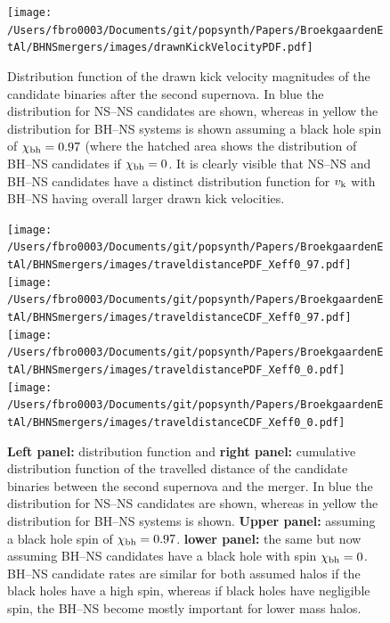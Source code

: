 \documentclass[a4paper,fleqn,usenatbib,useAMS,usedcolumn]{mnras}
\begin{document}
\begin{figure}
	\texttt{[image: /Users/fbro0003/Documents/git/popsynth/Papers/BroekgaardenEtAl/BHNSmergers/images/drawnKickVelocityPDF.pdf]} %
    \caption{Distribution function of the drawn kick velocity magnitudes of the candidate binaries after the second supernova. In blue the distribution for NS--NS candidates are shown, whereas in yellow the distribution for BH--NS systems is shown assuming a black hole spin of  $\chi_{\rm{bh}} = 0.97$ (where the hatched  area shows the distribution of BH--NS candidates if $\chi_{\rm{bh}} = 0$. It is clearly visible that NS--NS and BH--NS candidates have a distinct distribution function for $v_{\rm{k }}$ with BH--NS having overall larger drawn kick velocities.}
    \label{fig:NbinariesVsNHits}
\end{figure}
%

%
\begin{figure}
		\texttt{[image: /Users/fbro0003/Documents/git/popsynth/Papers/BroekgaardenEtAl/BHNSmergers/images/traveldistancePDF\_Xeff0\_97.pdf]}
		\texttt{[image: /Users/fbro0003/Documents/git/popsynth/Papers/BroekgaardenEtAl/BHNSmergers/images/traveldistanceCDF\_Xeff0\_97.pdf]}
%
		\texttt{[image: /Users/fbro0003/Documents/git/popsynth/Papers/BroekgaardenEtAl/BHNSmergers/images/traveldistancePDF\_Xeff0\_0.pdf]}
		\texttt{[image: /Users/fbro0003/Documents/git/popsynth/Papers/BroekgaardenEtAl/BHNSmergers/images/traveldistanceCDF\_Xeff0\_0.pdf]}
    \caption{\textbf{Left panel:} distribution function and \textbf{right panel:} cumulative distribution function of the travelled distance of the candidate binaries between the second supernova and the merger. In blue the distribution for NS--NS candidates are shown, whereas in yellow the distribution for BH--NS systems is shown. \textbf{Upper panel:}  assuming a black hole spin of  $\chi_{\rm{bh}} = 0.97$. \textbf{lower panel:} the same but now assuming BH--NS candidates have a black hole with spin $\chi_{\rm{bh}} = 0$.  BH--NS candidate rates are similar for both assumed halos if the black holes have a high spin, whereas if black holes have negligible spin, the BH--NS become mostly important for lower mass halos. } 
    \label{fig:RateCandidateEnriching}
\end{figure}
\end{document}
